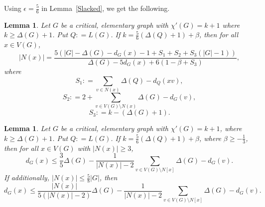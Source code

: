 \documentclass[12pt]{article}
\theoremstyle{plain}
\newtheorem{lem}[thm]{Lemma}
\theoremstyle{definition}
\theoremstyle{remark}
\newcommand{\card}[1]{\left|#1\right|}
\newcommand{\parens}[1]{\left( #1 \right)}
\newcommand{\DefinedAs}{\mathrel{\mathop:}=}
\begin{document}
Using $\epsilon = \frac56$ in Lemma~\ref{Slacked}, we get the following.

\begin{lem}
\label{Slacked56}
Let $G$ be a critical, elementary graph with $\chi'(G) = k + 1$ where $k \ge \Delta(G) + 1$.  Put $Q \DefinedAs L(G)$. 
If $k = \frac56\parens{\Delta(Q) + 1} + \beta$, then for all $x \in V(G)$,
\[\card{N(x)} = \frac{5\parens{\card{G} - \Delta(G) - d_G(x) - 1 + S_1 + S_2 + S_3\parens{\card{G} - 1}}}{\Delta(G) - 5 d_G(x) + 6(1 - \beta + S_3)},\]
where 
\[S_1 \DefinedAs \sum_{v \in N(x)} \Delta(Q) - d_Q(xv),\]
\[S_2 \DefinedAs 2 + \sum_{v \in V(G) \setminus N(x)} \Delta(G) - d_G(v),\]
\[S_3 \DefinedAs k - (\Delta(G) + 1).\]
\end{lem}


\begin{lem}
\label{DegreeBoundedForMiddling}
Let $G$ be a critical, elementary graph with $\chi'(G) = k + 1$, where $k \ge
\Delta(G) + 1$.  Put $Q \DefinedAs L(G)$.  If $k = \frac56\parens{\Delta(Q) +
1} + \beta$, where $\beta \ge -\frac13$, then for all $x \in V(G)$ with
$\card{N(x)} \ge 3$, \[d_G(x) \le \frac{3}{5}\Delta(G) - \frac{1}{\card{N(x)} -
2}\sum_{v \in V(G)\setminus N[x]} \Delta(G) - d_G(v).\]
If additionally, $\card{N(x)} \le \frac58\card{G}$, then
\[d_G(x) \le \frac{\card{N(x)}}{5\parens{\card{N(x)} - 2}}\Delta(G) - \frac{1}{\card{N(x)} - 2}\sum_{v \in V(G)\setminus N[x]} \Delta(G) - d_G(v).\]
\end{lem}
\end{document}

